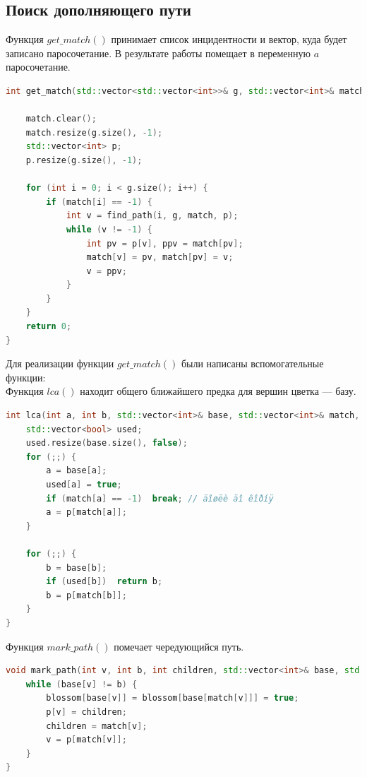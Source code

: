 \documentclass[14pt, a4paper]{extarticle}
\begin{document}
    \subsection*{Поиск дополняющего пути}

    Функция $get\_match()$ принимает список инцидентности и вектор, куда будет записано паросочетание. В результате работы помещает в переменную $a$ паросочетание.

    \begin{lstlisting}[language=c++]
int get_match(std::vector<std::vector<int>>& g, std::vector<int>& match) {

	match.clear();
	match.resize(g.size(), -1);
	std::vector<int> p;
	p.resize(g.size(), -1);

	for (int i = 0; i < g.size(); i++) {
		if (match[i] == -1) {
			int v = find_path(i, g, match, p);
			while (v != -1) {
				int pv = p[v], ppv = match[pv];
				match[v] = pv, match[pv] = v;
				v = ppv;
			}
		}
	}
	return 0;
}
    \end{lstlisting}

    \pagebreak

    Для реализации функции $get\_match()$ были написаны вспомогательные функции:\\

    Функция $lca()$ находит общего ближайшего предка для вершин цветка --- базу.

    \begin{lstlisting}[language=c++]
int lca(int a, int b, std::vector<int>& base, std::vector<int>& match, std::vector<int>& p) {
	std::vector<bool> used;
	used.resize(base.size(), false);
	for (;;) {
		a = base[a];
		used[a] = true;
		if (match[a] == -1)  break; // äîøëè äî êîðíÿ
		a = p[match[a]];
	}

	for (;;) {
		b = base[b];
		if (used[b])  return b;
		b = p[match[b]];
	}
}
    \end{lstlisting}

    Функция $mark\_path()$ помечает чередующийся путь. 

    \begin{lstlisting}[language=c++]
void mark_path(int v, int b, int children, std::vector<int>& base, std::vector<int>& match, std::vector<int>& p, std::vector<bool>& blossom) {
	while (base[v] != b) {
		blossom[base[v]] = blossom[base[match[v]]] = true;
		p[v] = children;
		children = match[v];
		v = p[match[v]];
	}
}

    \end{lstlisting}
\end{document}
